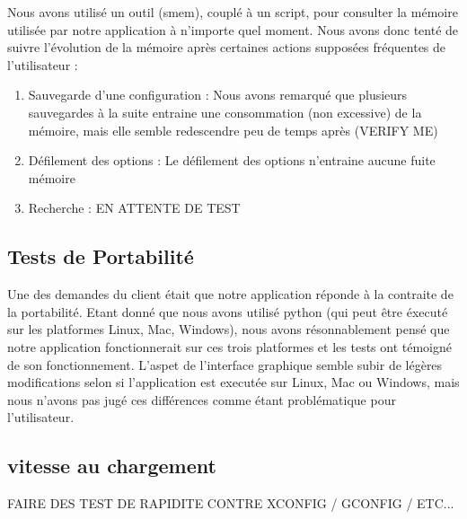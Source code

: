 \documentclass[16pts]{report}
\begin{document}
Nous avons utilisé un outil (smem), couplé à un script, pour consulter la 
mémoire utilisée par notre application à n'importe quel moment. Nous avons 
donc tenté de suivre l'évolution de la mémoire après certaines actions supposées
fréquentes de l'utilisateur : \\

\begin{enumerate}
	\item Sauvegarde d'une configuration : Nous avons remarqué que 
          plusieurs sauvegardes à la suite entraine une consommation 
          (non excessive) de la mémoire, mais elle semble redescendre
          peu de temps après (VERIFY ME)

	\item Défilement des options : Le défilement des options n'entraine
          aucune fuite mémoire

	\item Recherche : EN ATTENTE DE TEST 
\end{enumerate}


\subsection{Tests de Portabilité}

Une des demandes du client était que notre application réponde à la contraite
de la portabilité. Etant donné que nous avons utilisé python (qui peut être 
éxecuté sur les platformes Linux, Mac, Windows), nous avons résonnablement
pensé que notre application fonctionnerait sur ces trois platformes et les tests
ont témoigné de son fonctionnement. L'aspet de l'interface graphique semble
subir de légères modifications selon si l'application est executée sur Linux,
Mac ou Windows, mais nous n'avons pas jugé ces différences comme étant
problématique pour l'utilisateur.

\subsection{vitesse au chargement}

FAIRE DES TEST DE RAPIDITE CONTRE XCONFIG / GCONFIG / ETC...
\end{document}
